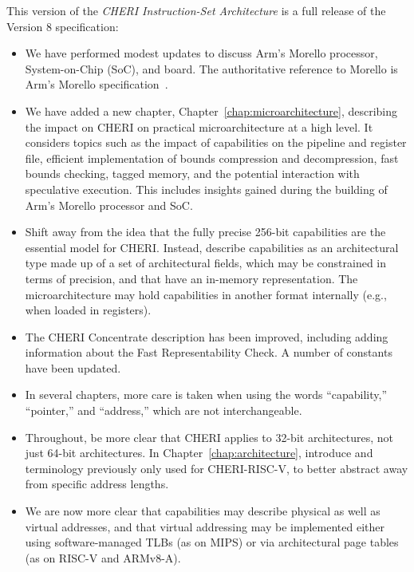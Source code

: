 This version of the \textit{CHERI Instruction-Set Architecture} is a full
release of the Version 8 specification:

\begin{itemize}
\item We have performed modest updates to discuss Arm's Morello processor,
  System-on-Chip (SoC), and board.
  The authoritative reference to Morello is Arm's Morello
  specification~\cite{arm-morello}.

\item We have added a new chapter, Chapter~\ref{chap:microarchitecture},
  describing the impact on CHERI on practical microarchitecture at a high
  level.
  It considers topics such as the impact of capabilities on the pipeline and
  register file, efficient implementation of bounds compression and
  decompression, fast bounds checking, tagged memory, and the potential
  interaction with speculative execution.
  This includes insights gained during the building of Arm's Morello
  processor and SoC.

\item Shift away from the idea that the fully precise 256-bit capabilities
  are the essential model for CHERI.
  Instead, describe capabilities as an architectural type made up of a set
  of architectural fields, which may be constrained in terms of precision, and
  that have an in-memory representation.
  The microarchitecture may hold capabilities in another format internally
  (e.g., when loaded in registers).

\item The CHERI Concentrate description has been improved, including adding
  information about the Fast Representability Check.
  A number of constants have been updated.

\item In several chapters, more care is taken when using the words
  ``capability,'' ``pointer,'' and ``address,'' which are not interchangeable.

\item Throughout, be more clear that CHERI applies to 32-bit architectures,
  not just 64-bit architectures.
  In Chapter~\ref{chap:architecture}, introduce \xlen{} and \clen{}
  terminology previously only used for CHERI-RISC-V, to better abstract away
  from specific address lengths.

\item We are now more clear that capabilities may describe physical as well as
  virtual addresses, and that virtual addressing may be implemented either
  using software-managed TLBs (as on MIPS) or via architectural page tables
  (as on RISC-V and ARMv8-A).


\end{itemize}
